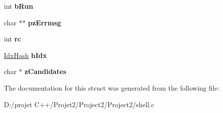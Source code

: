 \begin{DoxyCompactItemize}
\mbox{\label{structsqlite3expert_aea9d65396dbdd1b926d21189ab5b1044}} 
int {\bfseries b\+Run}
\item 
\mbox{\label{structsqlite3expert_af4790e8d8d599fbbe14ea1297579ed9c}} 
char $\ast$$\ast$ {\bfseries pz\+Errmsg}
\item 
\mbox{\label{structsqlite3expert_a1f889bcad0c89aeb96695399d139b085}} 
int {\bfseries rc}
\item 
\mbox{\label{structsqlite3expert_a536851d8e85581ff07d0d7433845f61b}} 
\mbox{\hyperlink{struct_idx_hash}{Idx\+Hash}} {\bfseries h\+Idx}
\item 
\mbox{\label{structsqlite3expert_af4c4f65e2c70e196e6d9d1fa6e2ba3f0}} 
char $\ast$ {\bfseries z\+Candidates}
\end{DoxyCompactItemize}


The documentation for this struct was generated from the following file\+:\begin{DoxyCompactItemize}
\item 
D\+:/projet C++/\+Projet2/\+Project2/\+Project2/shell.\+c\end{DoxyCompactItemize}
